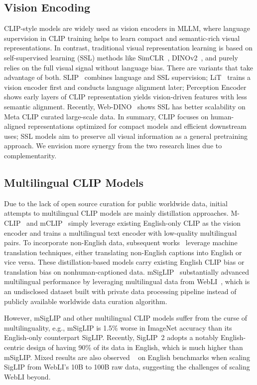 \subsection{Vision Encoding}
\label{sec:related_ve}

CLIP-style models are widely used as vision encoders in MLLM, where language supervision in CLIP training helps to learn compact and semantic-rich visual representations. In contrast, traditional visual representation learning is based on self-supervised learning (SSL) methods like SimCLR~\citep{chen2020simple}, DINOv2~\citep{oquab2024dinov2}, and purely relies on the full visual signal without language bias.
There are variants that take advantage of both. 
SLIP~\citep{mu2021slip} combines language and SSL supervision; LiT~\citep{zhai2022lit} trains a vision encoder first and conducts language alignment later; Perception Encoder~\citep{bolya2025perception} shows early layers of CLIP representation yields vision-driven features with less semantic alignment. Recently, Web-DINO~\citep{fan2025scaling} shows SSL has better scalability on Meta CLIP curated large-scale data.
In summary, CLIP focuses on human-aligned representations optimized for compact models and efficient downstream uses; SSL models aim to preserve all visual information as a 
general pretraining approach. We envision more synergy from the two research lines due to complementarity.

\subsection{Multilingual CLIP Models}
Due to the lack of open source curation for public worldwide data, initial attempts to multilingual CLIP models are mainly distillation approaches. M-CLIP~\citep{carlsson2022cross} and mCLIP~\citep{chen2023mclip} simply leverage existing English-only CLIP as the vision encoder and trains a multilingual text encoder with low-quality multilingual pairs. To incorporate non-English data, subsequent works~\citep{santos2023capivara, nguyen2024multilingual, pouget2024no} leverage machine translation techniques, either translating non-English captions into English or vice versa. These distillation-based models carry existing English CLIP bias or translation bias on nonhuman-captioned data.
mSigLIP~\citep{zhai2023sigmoid} substantially advanced multilingual performance
by leveraging multilingual data from WebLI~\citep{chen2023pali}, which is an undisclosed dataset built with private data processing pipeline instead of publicly available worldwide data curation algorithm.

However, mSigLIP and other multilingual CLIP models suffer from the curse of multilinguality, e.g., mSigLIP is 1.5\% worse in ImageNet accuracy than its English-only counterpart SigLIP. Recently, SigLIP~2 adopts a notably English-centric design of having 90\% of its data in English, which is much higher than mSigLIP.
Mixed results are also observed ~\citep{wang2025scaling} on English benchmarks when scaling SigLIP from WebLI's 10B to 100B raw data, suggesting the challenges of scaling WebLI beyond.
